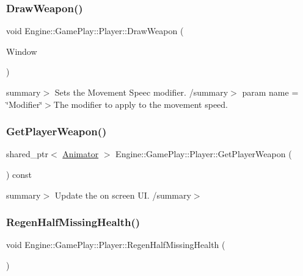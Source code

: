 \subsubsection{\texorpdfstring{Draw\+Weapon()}{DrawWeapon()}}
{\footnotesize\ttfamily void Engine\+::\+Game\+Play\+::\+Player\+::\+Draw\+Weapon (\begin{DoxyParamCaption}\item[{Render\+Window $\ast$}]{Window }\end{DoxyParamCaption})}

summary$>$ Sets the Movement Speec modifier. /summary$>$ param name = \char`\"{}\+Modifier\char`\"{}$>$The modifier to apply to the movement speed.\mbox{\label{class_engine_1_1_game_play_1_1_player_a270ca0729136ca9105b152c5147bdbf0}} 
\subsubsection{\texorpdfstring{Get\+Player\+Weapon()}{GetPlayerWeapon()}}
{\footnotesize\ttfamily shared\+\_\+ptr$<$ \hyperlink{class_engine_1_1_core_1_1_animator}{Animator} $>$ Engine\+::\+Game\+Play\+::\+Player\+::\+Get\+Player\+Weapon (\begin{DoxyParamCaption}\item[{void}]{ }\end{DoxyParamCaption}) const}

summary$>$ Update the on screen UI. /summary$>$ \mbox{\label{class_engine_1_1_game_play_1_1_player_aad2c7f9e75ef259e202be0d00924ec1d}} 
\subsubsection{\texorpdfstring{Regen\+Half\+Missing\+Health()}{RegenHalfMissingHealth()}}
{\footnotesize\ttfamily void Engine\+::\+Game\+Play\+::\+Player\+::\+Regen\+Half\+Missing\+Health (\begin{DoxyParamCaption}\item[{void}]{ }\end{DoxyParamCaption})}

